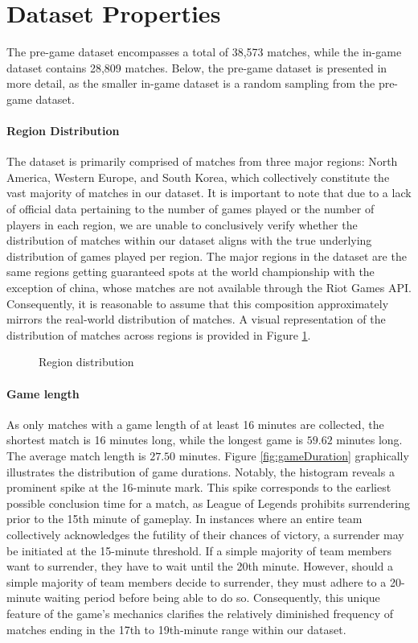 \documentclass[12pt, a4paper, headinclude, twoside, plainheadsepline, open=right, numbers=noenddot, hidelinks, toc=listof, toc=bibliography]{scrreprt}
\begin{document}
\section{Dataset Properties}
\label{sec:dataprop}

The pre-game dataset encompasses a total of 38,573 matches, while the in-game dataset contains 28,809 matches.
Below, the pre-game dataset is presented in more detail, as the smaller in-game dataset is a random sampling from the pre-game dataset.
\paragraph{Region Distribution}
The dataset is primarily comprised of matches from three major regions: North America, Western Europe, and South Korea, which collectively constitute the vast majority of matches in our dataset. 
It is important to note that due to a lack of official data pertaining to the number of games played or the number of players in each region, we are unable to conclusively verify whether the distribution of matches within our dataset aligns with the true underlying distribution of games played per region.
The major regions in the dataset are the same regions getting guaranteed spots at the world championship \cite{2023LeagueLegends2023} with the exception of china, whose matches are not available through the Riot Games API.
Consequently, it is reasonable to assume that this composition approximately mirrors the real-world distribution of matches.
A visual representation of the distribution of matches across regions is provided in Figure \ref{fig:platformId}.


\begin{figure}[ht]

\caption{Region distribution}
\label{fig:platformId}
\end{figure}

\paragraph{Game length}
As only matches with a game length of at least 16 minutes are collected, the shortest match is 16 minutes long, while the longest game is $59.62$ minutes long.
The average match length is $27.50$ minutes.
Figure \ref{fig:gameDuration} graphically illustrates the distribution of game durations. 
Notably, the histogram reveals a prominent spike at the 16-minute mark.
This spike corresponds to the earliest possible conclusion time for a match, as League of Legends prohibits surrendering prior to the 15th minute of gameplay. In instances where an entire team collectively acknowledges the futility of their chances of victory, a surrender may be initiated at the 15-minute threshold.
If a simple majority of team members want to surrender, they have to wait until the 20th minute.
However, should a simple majority of team members decide to surrender, they must adhere to a 20-minute waiting period before being able to do so. 
Consequently, this unique feature of the game's mechanics clarifies the relatively diminished frequency of matches ending in the 17th to 19th-minute range within our dataset.
\end{document}
